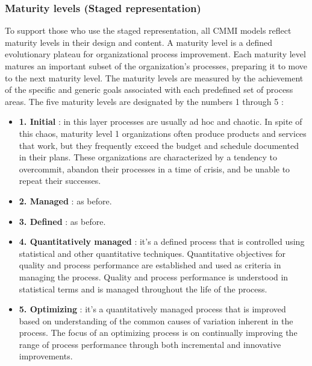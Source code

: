\documentclass[11pt]{article}
\begin{document}
\subsubsection{Maturity levels (Staged representation)}
To support those who use the staged representation, all CMMI models reflect maturity levels in their design and content. A maturity level is a defined evolutionary plateau for organizational process improvement. Each maturity level matures an important subset of the organization's processes, preparing it to move to the next maturity level. The maturity levels are measured by the achievement of the specific and generic goals associated with each predefined set of process areas. The five maturity levels are designated by the numbers 1 through 5 :
\begin{itemize}
\item \textbf{1. Initial} : in this layer processes are usually ad hoc and chaotic. In spite of this chaos, maturity level 1 organizations often produce products and services that work, but they frequently exceed the budget and schedule documented in their plans. These organizations are characterized by a tendency to overcommit, abandon their processes in a time of crisis, and be unable to repeat their successes.
\item \textbf{2. Managed} : as before.
\item \textbf{3. Defined} : as before.
\item \textbf{4. Quantitatively managed} : it's a defined process that is controlled using statistical and other quantitative techniques. Quantitative objectives for quality and process performance are established and used as criteria in managing the process. Quality and process performance is understood in statistical terms and is managed throughout the life of the process.
\item \textbf{5. Optimizing} : it's a quantitatively managed process that is improved based on understanding of the common causes of variation inherent in the process. The focus of an optimizing process is on continually improving the range of process performance through both incremental and innovative improvements.
\end{itemize}
\end{document}
